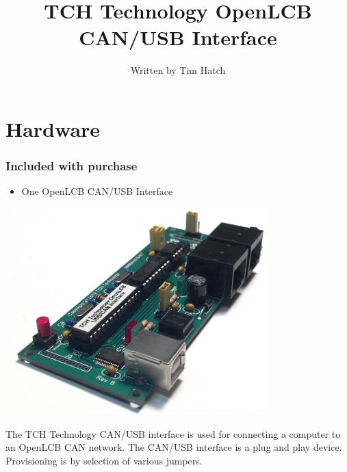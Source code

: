 \documentclass[11pt]{book}
\title{TCH Technology OpenLCB CAN/USB Interface}
\author{Written by Tim Hatch}
\begin{document}
\maketitle

\tableofcontents

\chapter{Hardware}
\subsection{Included with purchase}
\begin{itemize}
\item One OpenLCB CAN/USB Interface
\end{itemize}
\includegraphics[width=4in]{images/usb_can_a.png}


The TCH Technology CAN/USB interface is used for connecting a computer to an OpenLCB CAN network. The  CAN/USB interface is a plug and play device.  Provisioning is by selection of various jumpers.
\end{document}
